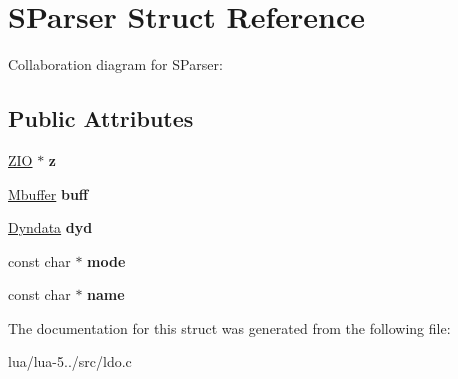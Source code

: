 \hypertarget{struct_s_parser}{\section{S\+Parser Struct Reference}
\label{struct_s_parser}
}


Collaboration diagram for S\+Parser\+:
\subsection*{Public Attributes}
\begin{DoxyCompactItemize}
\item 
\hypertarget{struct_s_parser_a15ddec33b9558bbcf1301fd9c0d392d1}{\hyperlink{struct_zio}{Z\+I\+O} $\ast$ {\bfseries z}}\label{struct_s_parser_a15ddec33b9558bbcf1301fd9c0d392d1}

\item 
\hypertarget{struct_s_parser_afa019f7efe369aa56d9e48e0e650c651}{\hyperlink{struct_mbuffer}{Mbuffer} {\bfseries buff}}\label{struct_s_parser_afa019f7efe369aa56d9e48e0e650c651}

\item 
\hypertarget{struct_s_parser_a14d6fa86e2bdb1e53b30dfb66e6617a1}{\hyperlink{struct_dyndata}{Dyndata} {\bfseries dyd}}\label{struct_s_parser_a14d6fa86e2bdb1e53b30dfb66e6617a1}

\item 
\hypertarget{struct_s_parser_a25c5daad34531f869484992824e91a65}{const char $\ast$ {\bfseries mode}}\label{struct_s_parser_a25c5daad34531f869484992824e91a65}

\item 
\hypertarget{struct_s_parser_a303a67fb99cde1a14d0069de9bb3285a}{const char $\ast$ {\bfseries name}}\label{struct_s_parser_a303a67fb99cde1a14d0069de9bb3285a}

\end{DoxyCompactItemize}


The documentation for this struct was generated from the following file\+:\begin{DoxyCompactItemize}
\item 
lua/lua-\/5../src/ldo.\+c\end{DoxyCompactItemize}
